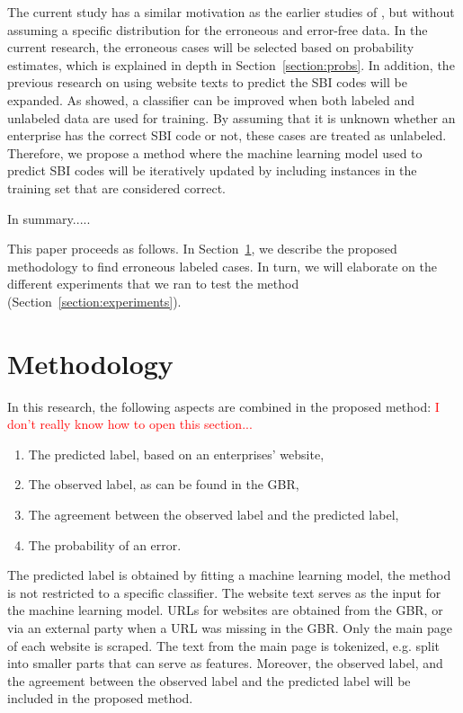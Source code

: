 \documentclass[12pt, a4paper, titlepage]{article}
\begin{document}
The current study has a similar motivation as the earlier studies of \citet{DiZio, Eskin}, but without assuming a specific distribution for the erroneous and error-free data. In the current research, the erroneous cases will be selected based on probability estimates, which is explained in depth in Section~\ref{section:probs}. In addition, the previous research on using website texts to predict the SBI codes will be expanded. As \citet{Nigam} showed, a classifier can be improved when both labeled and unlabeled data are used for training. By assuming that it is unknown whether an enterprise has the correct SBI code or not, these cases are treated as unlabeled. Therefore, we propose a method where the machine learning model used to predict SBI codes will be iteratively updated by including instances in the training set that are considered correct. 

In summary.....

\bigskip

This paper proceeds as follows. In Section~\ref{section:method}, we describe the proposed methodology to find erroneous labeled cases. In turn, we will elaborate on the different experiments that we ran to test the method (Section~\ref{section:experiments}). 




							\section{Methodology}
							\label{section:method}

In this research, the following aspects are combined in the proposed method:
\textcolor{red}{I don't really know how to open this section...}


\begin{enumerate}
\item The predicted label, based on an enterprises' website,
\item The observed label, as can be found in the GBR,
\item The agreement between the observed label and the predicted label,
\item The probability of an error.
\end{enumerate}

The predicted label is obtained by fitting a machine learning model, the method is not restricted to a specific classifier.  The website text serves as the input for the machine learning model. URLs for websites are obtained from the GBR, or via an external party when a URL was missing in the GBR. Only the main page of each website is scraped. The text from the main page is tokenized, e.g. split into smaller parts that can serve as features. Moreover, the observed label, and the agreement between the observed label and the predicted label will be included in the proposed method.
\end{document}
